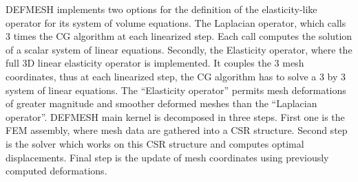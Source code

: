 \documentclass{IOS-Book-Article}
\begin{document}
DEFMESH implements two options for the definition of the elasticity-like operator for its system of volume equations.
The Laplacian operator, which calls 3 times the CG algorithm at each linearized step. Each call computes the solution of a scalar system of linear equations.
Secondly, the Elasticity operator, where the full 3D linear elasticity operator is implemented.
It couples the 3 mesh coordinates, thus at each linearized step, the CG algorithm has to solve a 3 by 3 system of linear equations.
The “Elasticity operator” permits mesh deformations of greater magnitude and smoother deformed meshes than the “Laplacian operator”. DEFMESH main kernel is decomposed in three steps.
First one is the FEM assembly, where mesh data are gathered into a CSR structure.
Second step is the solver which works on this CSR structure and computes optimal displacements.
Final step is the update of mesh coordinates using previously computed deformations.
\end{document}
